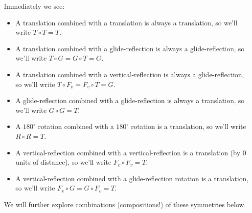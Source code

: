 \documentclass[noauthor,nooutcomes,hints        ]{ximera}
\begin{document}
Immediately we see:
\begin{itemize}
\item A translation combined with a translation is always a
  translation, so we'll write $T\circ T = T$.
\item A translation combined with a glide-reflection is always a
  glide-reflection, so we'll write $T\circ G = G \circ T = G$.
\item A translation combined with a vertical-reflection is always a
  glide-reflection, so we'll write $T\circ F_v = F_v \circ T = G$.
\item A glide-reflection combined with a glide-reflection is always a
  translation, so we'll write $G\circ G = T$.
\item A $180^\circ$ rotation combined with a $180^\circ$ rotation is a
  translation, so we'll write $R\circ R = T$.
\item A vertical-reflection combined with a vertical-reflection is a
  translation (by $0$ units of distance), so we'll write $F_v\circ F_v
  = T$.
\item A vertical-reflection combined with a glide-reflection rotation
  is a translation, so we'll write $F_v\circ G = G \circ F_v = T$.
\end{itemize}


We will further explore combinations (compositions!) of these symmetries below.



\mynewpage
\end{document}
